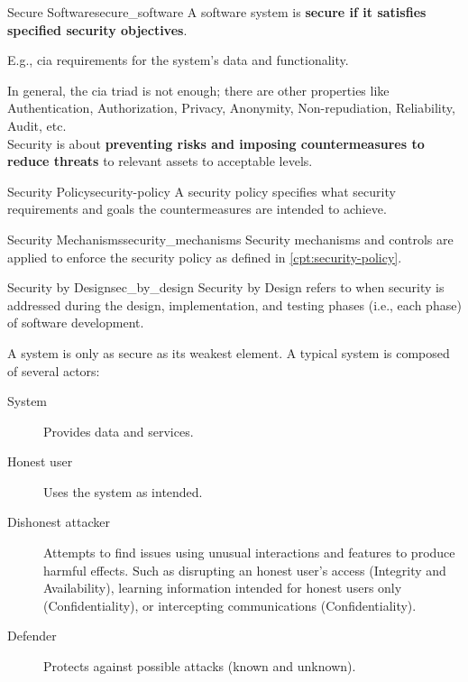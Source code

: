 \begin{definition}{Secure Software}{secure_software}
    A software system is \textbf{secure if it satisfies specified security objectives}.

    E.g., \gls{cia} requirements for the system's data and functionality.
\end{definition}

In general, the \gls{cia} triad is not enough; there are other properties like Authentication, Authorization, Privacy, Anonymity, Non-repudiation, Reliability, Audit, etc. \\
Security is about \textbf{preventing risks and imposing countermeasures to reduce threats} to relevant assets to acceptable levels.

\begin{concept}{Security Policy}{security-policy}
    A security policy specifies what security requirements and goals the countermeasures are intended to achieve.
\end{concept}

\begin{concept}{Security Mechanisms}{security_mechanisms}
    Security mechanisms and controls are applied to enforce the security policy as defined in \cref{cpt:security-policy}.
\end{concept}

\begin{concept}{Security by Design}{sec_by_design}
    Security by Design refers to when security is addressed during the design, implementation, and testing phases (i.e., each phase) of software development.
\end{concept}

A system is only as secure as its weakest element. A typical system is composed of several actors:
\begin{description}
    \item[System] Provides data and services.
    \item[Honest user] Uses the system as intended.
    \item[Dishonest attacker] Attempts to find issues using unusual interactions and features to produce harmful effects. Such as disrupting an honest user's access (Integrity and Availability), learning information intended for honest users only (Confidentiality), or intercepting communications (Confidentiality).
    \item[Defender] Protects against possible attacks (known and unknown).
\end{description}

